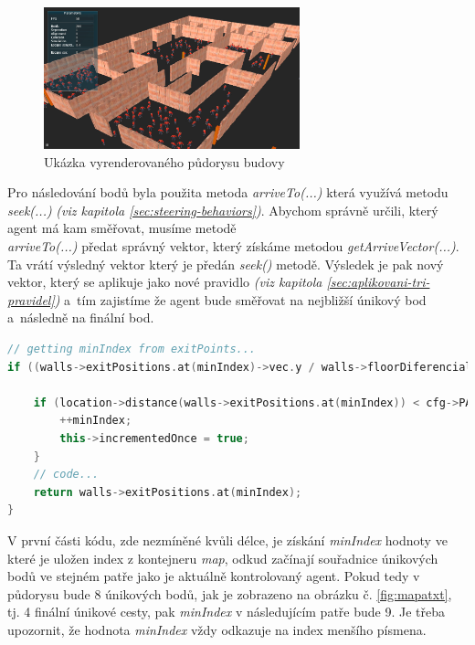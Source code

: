 \documentclass[czech,public,dept460,male,cpdeclaration]{diploma}
\begin{document}
\begin{figure}[H]\centering\includegraphics[width=0.66\textwidth]{Figures/screen5.jpg}
	\caption{Ukázka vyrenderovaného půdorysu budovy}
\end{figure}

Pro následování bodů byla použita metoda \textit{arriveTo(...)} která využívá metodu \textit{seek(...)} \textit{(viz kapitola \ref{sec:steering-behaviors})}. Abychom správně určili, který agent má kam směřovat, musíme metodě\\\textit{arriveTo(...)} předat správný vektor, který získáme metodou \textit{getArriveVector(...)}. Ta vrátí výsledný vektor který je předán \textit{seek()} metodě. Výsledek je pak nový vektor, který se aplikuje jako nové pravidlo \textit{(viz kapitola \ref{sec:aplikovani-tri-pravidel})} a~tím zajistíme že agent bude směřovat na nejbližší únikový bod a~následně na finální bod. 

\begin{lstlisting}[language=c++,label=src:mapSave,caption=Princip metody getArriveVector(...)]
// getting minIndex from exitPoints...
if ((walls->exitPositions.at(minIndex)->vec.y / walls->floorDiferencial) == this->floor) {
	
	if (location->distance(walls->exitPositions.at(minIndex)) < cfg->PATH_TO_FIND_RADIUS && !this->incrementedOnce) {
		++minIndex;
		this->incrementedOnce = true;
	}
	// code...
	return walls->exitPositions.at(minIndex);
}
\end{lstlisting}

V první části kódu, zde nezmíněné kvůli délce, je získání \textit{minIndex} hodnoty ve které je uložen index z kontejneru \textit{map}, odkud začínají souřadnice únikových bodů ve stejném patře jako je aktuálně kontrolovaný agent. Pokud tedy v půdorysu bude 8 únikových bodů, jak je zobrazeno na obrázku č. \ref{fig:mapatxt}, tj. 4 finální únikové cesty, pak \textit{minIndex} v následujícím patře bude 9. Je třeba upozornit, že hodnota \textit{minIndex} vždy odkazuje na index menšího písmena.
\end{document}
